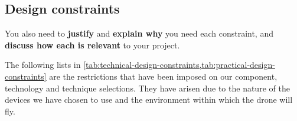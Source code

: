\documentclass[../main.tex]{subfiles}
\begin{document}
\subsection{Design constraints}

\begin{newrequirements}
    \begin{todolist}
        \item You also need to \textbf{justify} and 
        \textbf{explain why} you need 
        each constraint, and 
        \textbf{discuss how each is relevant}
        to your project.
    \end{todolist}
\end{newrequirements}

The following lists in 
\cref{tab:technical-design-constraints,tab:practical-design-constraints} 
are the restrictions that have been imposed
on our component, technology and technique selections. 
They have arisen due to the nature of 
the devices we have chosen to use 
and the environment within which the drone will fly.
\end{document}
